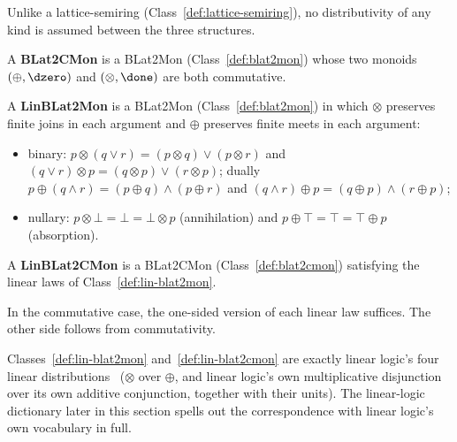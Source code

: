 Unlike a lattice-semiring (Class~\ref{def:lattice-semiring}), no
distributivity of any kind is assumed between the three structures.

\begin{class}
\label{def:blat2cmon}
\leanok
A \textbf{BLat2CMon} is a BLat2Mon (Class~\ref{def:blat2mon}) whose
two monoids $(\oplus,\dzero)$ and $(\otimes,\done)$ are both commutative.
\end{class}

\begin{class}
\label{def:lin-blat2mon}
\leanok
A \textbf{LinBLat2Mon} is a BLat2Mon (Class~\ref{def:blat2mon}) in
which $\otimes$ preserves finite joins in each argument and $\oplus$
preserves finite meets in each argument:
\begin{itemize}
\item binary: $p \otimes (q \vee r) = (p \otimes q) \vee (p \otimes r)$ and
  $(q \vee r) \otimes p = (q \otimes p) \vee (r \otimes p)$; dually
  $p \oplus (q \wedge r) = (p \oplus q) \wedge (p \oplus r)$ and
  $(q \wedge r) \oplus p = (q \oplus p) \wedge (r \oplus p)$;
\item nullary: $p \otimes \bot = \bot = \bot \otimes p$ (annihilation) and
  $p \oplus \top = \top = \top \oplus p$ (absorption).
\end{itemize}
\end{class}

\begin{class}
\label{def:lin-blat2cmon}
\leanok
A \textbf{LinBLat2CMon} is a BLat2CMon (Class~\ref{def:blat2cmon})
satisfying the linear laws of Class~\ref{def:lin-blat2mon}.
\end{class}

In the commutative case, the one-sided version of each linear law
suffices. The other side follows from commutativity.

Classes~\ref{def:lin-blat2mon} and~\ref{def:lin-blat2cmon} are exactly
linear logic's four linear distributions~\citep{girardLinearLogic1987}
($\otimes$ over $\oplus$, and linear logic's own multiplicative
disjunction over its own additive conjunction, together with their
units). The linear-logic dictionary later in this section spells out
the correspondence with linear logic's own vocabulary in full.

